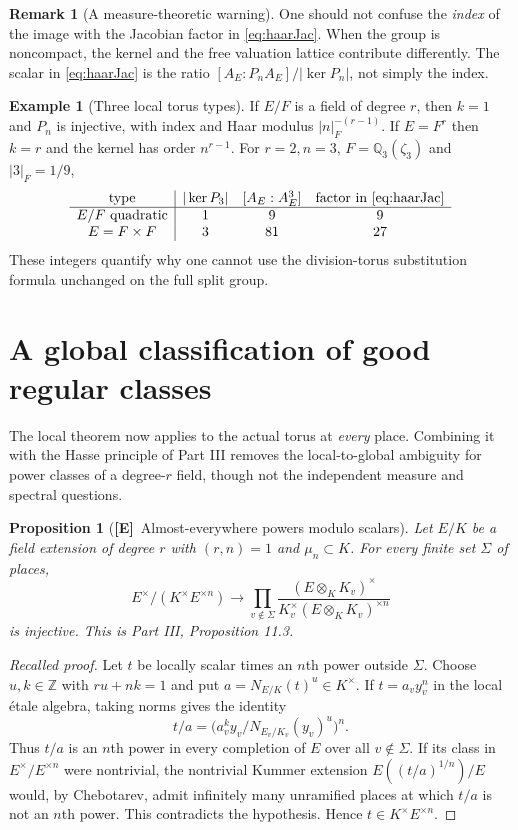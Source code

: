 \documentclass[11pt]{article}
\newcommand{\Z}{\mathbb Z}
\newcommand{\Etag}{\textnormal{\textbf{[E]}}}
\theoremstyle{plain}
\newtheorem{proposition}[theorem]{Proposition}
\theoremstyle{definition}
\newtheorem{remark}[theorem]{Remark}
\newtheorem{example}[theorem]{Example}
\begin{document}
\begin{remark}[A measure-theoretic warning]\label{rem:haar}
One should not confuse the \emph{index} of the image with the
Jacobian factor in \eqref{eq:haarJac}.  When the group is noncompact,
the kernel and the free valuation lattice contribute differently.
The scalar in \eqref{eq:haarJac} is the ratio
$[A_E:P_nA_E]/|\ker P_n|$, not simply the index.
\end{remark}

\begin{example}[Three local torus types]
If $E/F$ is a field of degree $r$, then $k=1$ and $P_n$ is
injective, with index and Haar modulus $|n|_F^{-(r-1)}$.
If $E=F^r$ then $k=r$ and the kernel has order $n^{r-1}$.
For $r=2,n=3$, $F=\mathbb Q_3(\zeta_3)$ and $|3|_F=1/9$,
\[
\begin{array}{c|ccc}
\text{type}&|\ker P_3|&[A_E:A_E^3]&\text{factor in \eqref{eq:haarJac}}\\\hline
E/F\text{ quadratic}&1&9&9\\
E=F\times F&3&81&27
\end{array}
\]
These integers quantify why one cannot use the division-torus
substitution formula unchanged on the full split group.
\end{example}

\section{A global classification of good regular classes}\label{sec:globalgood}
The local theorem now applies to the actual torus at \emph{every}
place.  Combining it with the Hasse principle of Part III removes
the local-to-global ambiguity for power classes of a degree-$r$
field, though not the independent measure and spectral questions.

\begin{proposition}[\Etag\ Almost-everywhere powers modulo scalars]\label{prop:Hasse}
Let $E/K$ be a field extension of degree $r$ with $(r,n)=1$ and
$\mu_n\subset K$.  For every finite set $\Sigma$ of places,
\begin{equation}\label{eq:Hasse}
 E^\times/(K^\times E^{\times n})\longrightarrow
 \prod_{v\notin\Sigma}
 \frac{(E\otimes_K K_v)^\times}
 {K_v^\times(E\otimes_KK_v)^{\times n}}
\end{equation}
is injective.  This is Part III, Proposition 11.3.
\end{proposition}
\begin{proof}[Recalled proof]
Let $t$ be locally scalar times an $n$th power outside $\Sigma$.
Choose $u,k\in\Z$ with $ru+nk=1$ and put
$a=N_{E/K}(t)^u\in K^\times$.  If $t=a_v y_v^n$ in the local
\'etale algebra, taking norms gives the identity
\[
 t/a=\bigl(a_v^k y_v/N_{E_v/K_v}(y_v)^u\bigr)^n.
\]
Thus $t/a$ is an $n$th power in every completion of $E$ over all
$v\notin\Sigma$.  If its class in $E^\times/E^{\times n}$ were
nontrivial, the nontrivial Kummer extension
$E((t/a)^{1/n})/E$ would, by Chebotarev, admit infinitely many
unramified places at which $t/a$ is not an $n$th power.
This contradicts the hypothesis.  Hence $t\in K^\times E^{\times n}$.
\end{proof}
\end{document}
